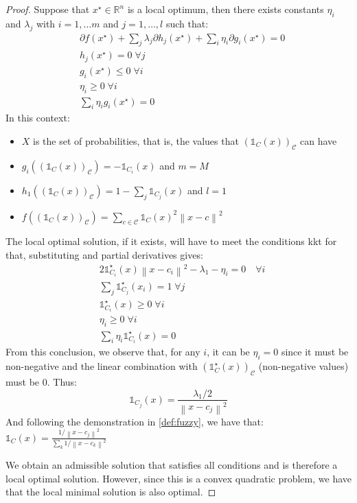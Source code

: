 \begin{theorem}
\begin{proof}
	\noindent Suppose that $x^\star\in\mathbb{R}^n$ is a local optimum, then there exists constants $\eta_i$ and $\lambda_j$ with $i=1,\ldots m$ and $j=1,\ldots,l$ such that:
	\begin{align*}
		&\partial f(x^\star) + \sum_j \lambda_j \partial h_j(x^\star) + \sum_i \eta_i \partial g_i(x^\star) = 0\\
		&h_j(x^\star)=0 \; \forall j\\
		&g_i(x^\star)\leq0 \; \forall i\\
		&\eta_i \geq 0\;\forall i \\
		&\sum_i \eta_i g_i(x^\star) = 0
	\end{align*}
	\upshape
	In this context:
	\begin{itemize}
		\item $X$ is the set of probabilities, that is, the values that $\left(\mathds{1}_C(x)\right)_\mathcal{C}$ can have
		\item $g_i(\left(\mathds{1}_C(x)\right)_\mathcal{C}) = -\mathds{1}_{C_i}(x)$ and $m=M$
		\item $h_1(\left(\mathds{1}_C(x)\right)_\mathcal{C}) = 1 - \sum_j \mathds{1}_{C_j}(x)$ and $l=1$
		\item $f(\left(\mathds{1}_C(x)\right)_\mathcal{C}) = \sum_{c \in \mathcal{C}}\mathds{1}_C(x)^2\left\|x-c\right\|^2$
	\end{itemize}
	The local optimal solution, if it exists, will have to meet the conditions \gls{kkt} for that, substituting and partial derivatives gives:
	\begin{align*}
		&2\mathds{1}^\star_{C_i}(x)\left\|x-c_i\right\|^2 - \lambda_1 - \eta_i = 0 \quad \forall i\\
		&\sum_j \mathds{1}^\star_{C_j}(x_i)=1 \; \forall j\\
		&\mathds{1}^\star_{C_i}(x)\geq0 \; \forall i\\
		&\eta_i \geq 0\;\forall i \\
		&\sum_i \eta_i \mathds{1}^\star_{C_i}(x) = 0
	\end{align*}
	From this conclusion, we observe that, for any $i$, it can be $\eta_i=0$ since it must be non-negative and the linear combination with $\left(\mathds{1}^\star_C(x)\right)_\mathcal{C}$ (non-negative values) must be $0$. Thus:
	$$\mathds{1}_{C_j}(x) = \frac{\lambda_1/2}{\left\|x-c_j\right\|^2}$$
	And following the demonstration in \cref{def:fuzzy}, we have that:\\
	$\mathds{1}_C(x) = \frac{1/\left\|x-c_j\right\|^2}{\sum_k 1/\left\|x-c_k\right\|^2}$

	\bigskip \noindent We obtain an admissible solution that satisfies all conditions and is therefore a local optimal solution. However, since this is a convex quadratic problem, we have that the local minimal solution is also optimal.
\end{proof}
\end{theorem}

